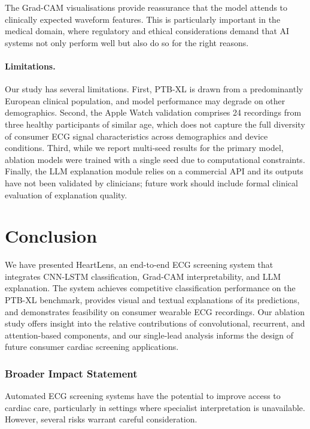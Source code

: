 \documentclass[10pt]{article}
\begin{document}
The Grad-CAM visualisations provide reassurance that the model attends to clinically expected waveform features. This is particularly important in the medical domain, where regulatory and ethical considerations demand that AI systems not only perform well but also do so for the right reasons.

\paragraph{Limitations.} Our study has several limitations. First, PTB-XL is drawn from a predominantly European clinical population, and model performance may degrade on other demographics. Second, the Apple Watch validation comprises 24 recordings from three healthy participants of similar age, which does not capture the full diversity of consumer ECG signal characteristics across demographics and device conditions. Third, while we report multi-seed results for the primary model, ablation models were trained with a single seed due to computational constraints. Finally, the LLM explanation module relies on a commercial API and its outputs have not been validated by clinicians; future work should include formal clinical evaluation of explanation quality.

\section{Conclusion}

We have presented HeartLens, an end-to-end ECG screening system that integrates CNN-LSTM classification, Grad-CAM interpretability, and LLM explanation. The system achieves competitive classification performance on the PTB-XL benchmark, provides visual and textual explanations of its predictions, and demonstrates feasibility on consumer wearable ECG recordings. Our ablation study offers insight into the relative contributions of convolutional, recurrent, and attention-based components, and our single-lead analysis informs the design of future consumer cardiac screening applications.

\subsubsection*{Broader Impact Statement}

Automated ECG screening systems have the potential to improve access to cardiac care, particularly in settings where specialist interpretation is unavailable. However, several risks warrant careful consideration.
\end{document}
